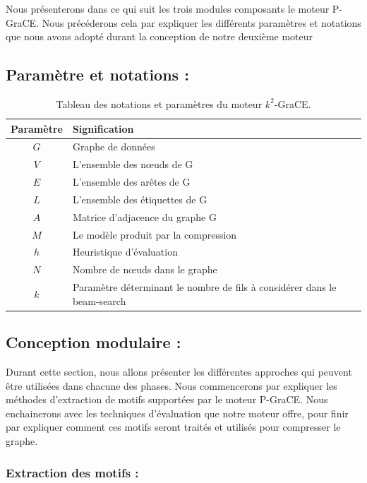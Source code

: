 \documentclass[a4paper,oneside,12pt]{report}
\theoremstyle{definition}
\begin{document}
Nous présenterons dans ce qui suit les trois modules composants le moteur P-GraCE. Nous précéderons  cela par expliquer les différents paramètres et notations que nous avons adopté durant la conception de notre deuxième moteur
		
		\subsection{Paramètre et notations :}
		
			\begin{table}[H]
		\centering
		\begin{tabular}{|c|L{12cm}|}
		\hline Paramètre & Signification \\ \hline\hline 
		$G$ & Graphe de données \\ \hline
		$V$ & L'ensemble des nœuds de G\\ \hline
		$E$ & L'ensemble des arêtes de G \\ \hline
		$L$ & L'ensemble des étiquettes de G \\ \hline
		$A$ & Matrice d'adjacence du graphe G\\ \hline
		$M$ & Le modèle produit par la compression\\ \hline
		$h$ & Heuristique d'évaluation \\ \hline
		$N$ & Nombre de nœuds dans le graphe \\ \hline
		$k$ & Paramètre déterminant le nombre de fils à considérer dans le beam-search\\ \hline
		
		\end{tabular}
		\caption{Tableau des notations et paramètres du moteur $k^2$-GraCE.}	
		\label{notk2grace}		
	\end{table}
		
		\subsection{Conception modulaire :}
		
		Durant cette section, nous allons présenter les différentes approches qui peuvent être utilisées dans chacune des phases. Nous commencerons par expliquer les méthodes d'extraction de motifs supportées par le moteur P-GraCE. Nous enchainerons avec les techniques d'évaluation que notre moteur offre, pour finir par expliquer comment ces motifs seront traités et utilisés pour compresser le graphe. 	
		
		
		\subsubsection{Extraction des motifs :}
\end{document}
